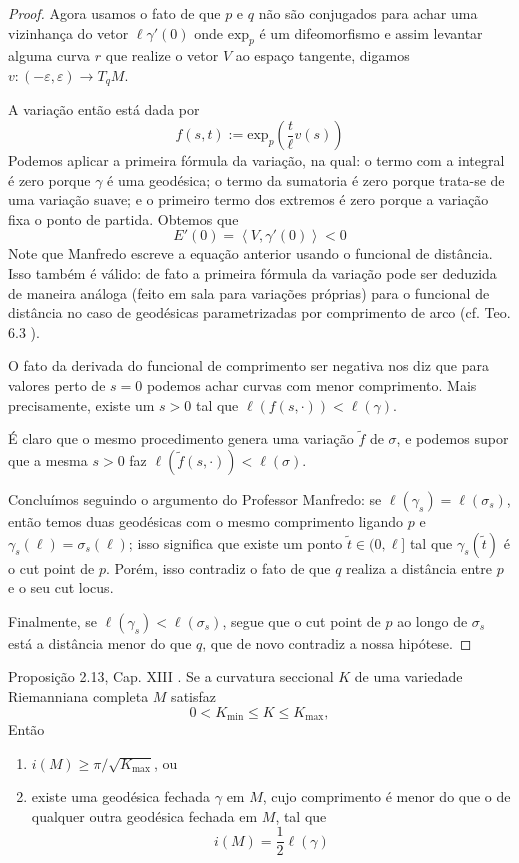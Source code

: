 \begin{proof}
Agora usamos o fato de que $p$ e $q$ não são conjugados para 
achar uma vizinhança do vetor $\ell \gamma'(0)$ onde $\text{exp}_p$ é um
difeomorfismo e assim levantar alguma
curva $r$ que realize o vetor $V$ ao espaço tangente,
 digamos $v:(-\varepsilon,\varepsilon) \to T_q M$.

A variação então está dada por
$$
f(s,t):=\text{exp}_p\left(\frac{t}{\ell}v(s)\right)
$$
Podemos aplicar a primeira fórmula da variação, na qual: o termo com a
integral é zero porque $\gamma$ é uma geodésica; o termo da sumatoria é zero
porque trata-se de uma variação suave; e o primeiro termo dos extremos é zero
porque a variação fixa o ponto de partida. Obtemos que 
$$
E'(0)=\left<V,\gamma'(0)\right><0
$$
Note que Manfredo escreve a equação anterior usando o funcional de distância. 
Isso também é válido: de fato a primeira fórmula da variação pode ser 
deduzida de maneira análoga (feito em sala para variações próprias) 
 para o funcional de distância no caso de geodésicas parametrizadas por 
comprimento de arco (cf. Teo. 6.3 \cite{ler}).

O fato da derivada do funcional de comprimento ser negativa nos diz que para
valores perto de $s=0$ podemos achar curvas com menor comprimento. Mais
precisamente, existe um $s>0$ tal que $\ell(f(s,\cdot))<\ell(\gamma)$.

É claro que o mesmo procedimento genera uma variação $\tilde{f}$ de $\sigma$, e 
podemos supor que a mesma $s>0$ faz $\ell(\tilde{f}(s,\cdot))<\ell(\sigma)$.

Concluímos seguindo o argumento do Professor Manfredo: se 
$\ell(\gamma_s)=\ell(\sigma_s)$, então temos duas geodésicas com o mesmo
comprimento ligando $p$ e $\gamma_s(\ell)=\sigma_s(\ell)$; isso significa 
que existe um ponto $\tilde{t} \in (0,\ell]$ tal que $\gamma_s(\tilde{t})$ é
 o cut point de $p$. Porém, isso contradiz o fato de que $q$ realiza a 
distância entre $p$ e o seu cut locus.

Finalmente, se $\ell(\gamma_s)<\ell(\sigma_s)$, segue que o cut point de $p$
 ao longo de $\sigma_s$ está a distância menor do que $q$, que de novo contradiz
a nossa hipótese.
\end{proof}

\begin{exercise}
\label{exercise-l8-2}
Proposição 2.13, Cap. XIII \cite{doc}. Se a curvatura seccional $K$ de uma
variedade Riemanniana completa $M$ satisfaz
$$
0< K_{\text{min}}\leq K\leq K_{\text{max}},
$$
Então
\begin{enumerate}
\item $i(M) \geq \pi/\sqrt{K_{\text{max}}}$, ou
\item existe uma geodésica fechada $\gamma$ em $M$, cujo comprimento é menor do 
que o de qualquer outra geodésica fechada em $M$, tal que
$$
i(M)=\frac{1}{2}\ell(\gamma)
$$
\end{enumerate}
\end{exercise}


